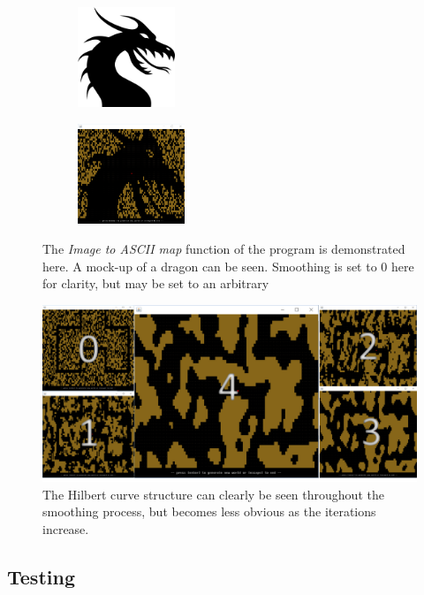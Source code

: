 \documentclass[12pt,a4paper]{article}
\begin{document}
\begin{figure}
\centering
\begin{subfigure}{.4\textwidth}
  \centering
  \includegraphics[width=.65\linewidth, height=3cm]{images/dragon.png}
\end{subfigure}
\begin{subfigure}{.4\textwidth}
  \centering
  \includegraphics[width=.65\linewidth, height=3cm]{images/dragonCave.PNG}
\end{subfigure}
\caption{The \emph{Image to ASCII map} function of the program is demonstrated here. A mock-up of a dragon can be seen. Smoothing is set to 0 here for clarity, but may be set to an arbitrary }
\label{fig:dragon}
\end{figure}


\begin{figure}
  \centering
 	\includegraphics[width=0.8\linewidth]{images/cavesmoothing.png}
	\caption[]{The Hilbert curve structure can clearly be seen throughout the smoothing process, but becomes less obvious as the iterations increase.}
	\label{fig:6}
\end{figure} 



\subsection{Testing}
\end{document}
